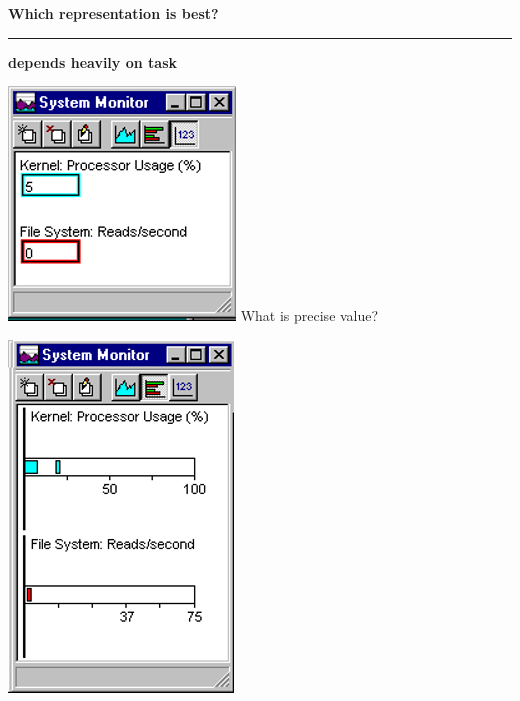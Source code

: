 \documentclass[pdf]{beamer}
\begin{document}
\begin{frame}
{\textbf{Which representation is best?}}{\textcolor{red}{\rule{12cm}{1.2pt}}}

{\textbf{\large depends heavily on task \large}}
\begin{minipage}[t]{0.9\linewidth}
\begin{minipage}[t]{0.25\linewidth}
\begin{flushleft}
	\includegraphics[scale=0.5]{9_Picture1.png}
    \newline
    \newline
    \newline
    \newline
    \newline
    \newline
    \newline
    \newline
    \newline
    \scriptsize What is precise value? \tiny
\end{flushleft}
\end{minipage}
\hfill
\begin{minipage}[t]{0.25\linewidth}
\begin{flushleft}
	\includegraphics[scale=0.5]{9_Picture2.png}

\end{flushleft}
\end{minipage}
\end{minipage}
\end{frame}
\end{document}
